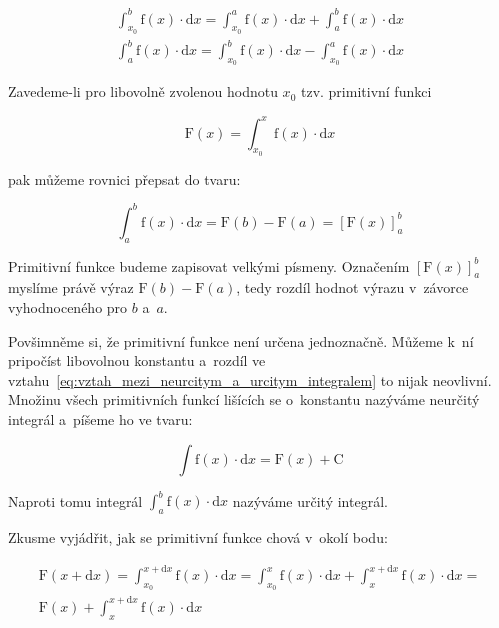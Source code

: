 \begin{equation}
\begin{split}
\int_{x_0}^{b} \mathrm{f}(x) \cdot \mathrm{d}x = \int_{x_0}^{a} \mathrm{f}(x) \cdot \mathrm{d}x + \int_{a}^{b} \mathrm{f}(x) \cdot \mathrm{d}x \\
\int_{a}^{b} \mathrm{f}(x) \cdot \mathrm{d}x = \int_{x_0}^{b} \mathrm{f}(x) \cdot \mathrm{d}x - \int_{x_0}^{a} \mathrm{f}(x) \cdot \mathrm{d}x
\end{split}
\end{equation}

Zavedeme-li pro libovolně zvolenou hodnotu \(x_0\) tzv. primitivní funkci

\begin{equation}
\mathrm{F}(x) = \int_{x_0}^{x} \mathrm{f}(x) \cdot \mathrm{d}x
\end{equation}

pak můžeme rovnici přepsat do tvaru:

\begin{equation}
\label{eq:vztah_mezi_neurcitym_a_urcitym_integralem}
\int_{a}^{b} \mathrm{f}(x) \cdot \mathrm{d}x = \mathrm{F}(b) - \mathrm{F}(a) = \left[\mathrm{F}(x)\right]_a^b 
\end{equation}

Primitivní funkce budeme zapisovat velkými písmeny.
Označením \(\left[\mathrm{F}(x)\right]_a^b\) myslíme právě výraz \(\mathrm{F}(b) - \mathrm{F}(a)\), tedy rozdíl hodnot výrazu v~závorce vyhodnoceného pro \(b\) a~\(a\).

Povšimněme si, že primitivní funkce není určena jednoznačně. Můžeme k~ní pripočíst libovolnou konstantu a~rozdíl ve vztahu~\eqref{eq:vztah_mezi_neurcitym_a_urcitym_integralem} to nijak neovlivní. Množinu všech primitivních funkcí lišících se o~konstantu nazýváme neurčitý integrál a~píšeme ho ve tvaru:

\begin{equation}
\int \mathrm{f}(x) \cdot \mathrm{d}x = \mathrm{F}(x) + \mathrm{C}
\end{equation}

Naproti tomu integrál \(\int_a^b \mathrm{f}(x) \cdot \mathrm{d}x\) nazýváme určitý integrál.

Zkusme vyjádřit, jak se primitivní funkce chová v~okolí bodu:

\begin{equation}
\begin{split}
\mathrm{F}(x + \mathrm{d}x) = \int_{x_0}^{x + \mathrm{d}x} \mathrm{f}(x) \cdot \mathrm{d}x = \int_{x_0}^{x} \mathrm{f}(x) \cdot \mathrm{d}x + \int_{x}^{x + \mathrm{d}x} \mathrm{f}(x) \cdot \mathrm{d}x = \\
\mathrm{F}(x) + \int_{x}^{x + \mathrm{d}x} \mathrm{f}(x) \cdot \mathrm{d}x
\end{split}
\end{equation}

